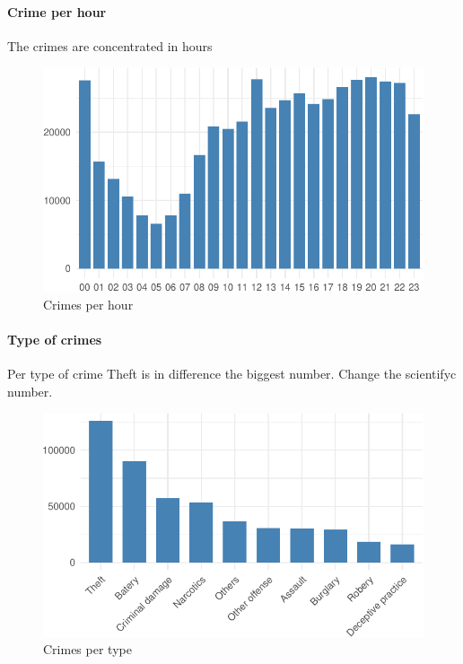 \documentclass[]{article}
\let\oldparagraph\paragraph
\renewcommand{\paragraph}[1]{\oldparagraph{#1}\mbox{}}
\begin{document}
\paragraph{Crime per hour}\label{crime-per-hour}

The crimes are concentrated in hours

\begin{figure}[H]

{\centering \includegraphics{Assessment_1v11_files/figure-latex/fig3-1} 

}

\caption{Crimes per hour}\label{fig:fig3}
\end{figure}

\paragraph{Type of crimes}\label{type-of-crimes}

Per type of crime Theft is in difference the biggest number. Change the
scientifyc number.

\begin{figure}[H]

{\centering \includegraphics{Assessment_1v11_files/figure-latex/fig6-1} 

}

\caption{Crimes per type}\label{fig:fig6}
\end{figure}
\end{document}
